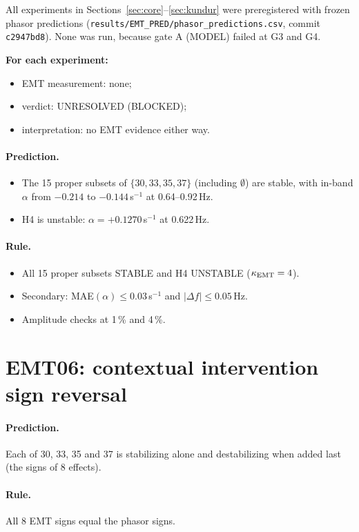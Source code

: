\documentclass[10pt,a4paper]{article}
\newcommand{\sinv}{\,s$^{-1}$}
\newcommand{\blocked}{\textsf{UNRESOLVED (BLOCKED)}}
\newcommand{\f}[1]{\nolinkurl{#1}}
\begin{document}
All experiments in Sections~\ref{sec:core}--\ref{sec:kundur} were
preregistered with frozen phasor predictions
(\f{results/EMT_PRED/phasor_predictions.csv}, commit \texttt{c2947bd8}). None
was run, because gate A (MODEL) failed at G3 and G4.

\textbf{For each experiment:}
\begin{itemize}
\item EMT measurement: none;
\item verdict: \blocked;
\item interpretation: no EMT evidence either way.
\end{itemize}

\paragraph{Prediction.}
\begin{itemize}
\item The 15 proper subsets of $\{30,33,35,37\}$ (including $\emptyset$) are
  stable, with in-band $\alpha$ from $-0.214$ to $-0.144$\sinv{} at
  0.64--0.92\,Hz.
\item H4 is unstable: $\alpha=+0.1270$\sinv{} at 0.622\,Hz.
\end{itemize}

\paragraph{Rule.}
\begin{itemize}
\item All 15 proper subsets STABLE and H4 UNSTABLE ($\kappa_{\rm EMT}=4$).
\item Secondary: MAE$(\alpha)\le0.03$\sinv{} and $|\Delta f|\le0.05$\,Hz.
\item Amplitude checks at 1\,\% and 4\,\%.
\end{itemize}

\section{EMT06: contextual intervention sign reversal}

\paragraph{Prediction.} Each of 30, 33, 35 and 37 is stabilizing alone and
destabilizing when added last (the signs of 8 effects).

\paragraph{Rule.} All 8 EMT signs equal the phasor signs.
\end{document}
